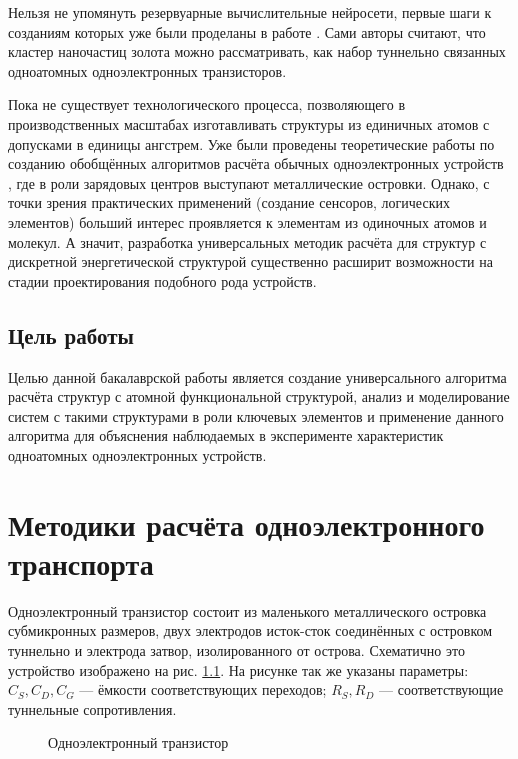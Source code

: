 \documentclass[12pt,a4paper]{report}
\begin{document}
Нельзя не упомянуть резервуарные вычислительные нейросети, первые шаги к созданиям которых уже были проделаны в работе \cite{neuro}. Сами авторы считают, что кластер наночастиц золота можно рассматривать, как набор туннельно связанных одноатомных одноэлектронных транзисторов. 

Пока не существует технологического процесса, позволяющего в производственных масштабах изготавливать структуры из единичных атомов с допусками в единицы ангстрем. Уже были проведены теоретические работы по созданию обобщённых алгоритмов расчёта обычных одноэлектронных устройств \cite{Dobr}, где в роли зарядовых центров выступают металлические островки. Однако, с точки зрения практических применений (создание сенсоров, логических элементов) больший интерес проявляется к элементам из одиночных атомов и молекул. А значит, разработка универсальных методик расчёта для структур с дискретной энергетической структурой существенно расширит возможности на стадии проектирования подобного рода устройств.



\section*{Цель работы}

Целью данной бакалаврской работы является создание универсального алгоритма расчёта структур с атомной функциональной структурой, анализ и моделирование систем с такими структурами в роли ключевых элементов и применение данного алгоритма для объяснения наблюдаемых в эксперименте характеристик одноатомных одноэлектронных устройств.


\chapter{Методики расчёта одноэлектронного транспорта}
Одноэлектронный транзистор состоит из маленького металлического островка субмикронных размеров, двух электродов исток-сток соединённых с островком туннельно и электрода затвор, изолированного от острова. Схематично это устройство изображено на рис. \ref{fig:SET}. На рисунке так же указаны параметры: $C_S, C_D, C_G$ — ёмкости соответствующих переходов; $R_S, R_D$ — соответствующие туннельные сопротивления.

\begin{figure}
	\caption{Одноэлектронный транзистор}
	\label{fig:SET}
\end{figure}
\end{document}
